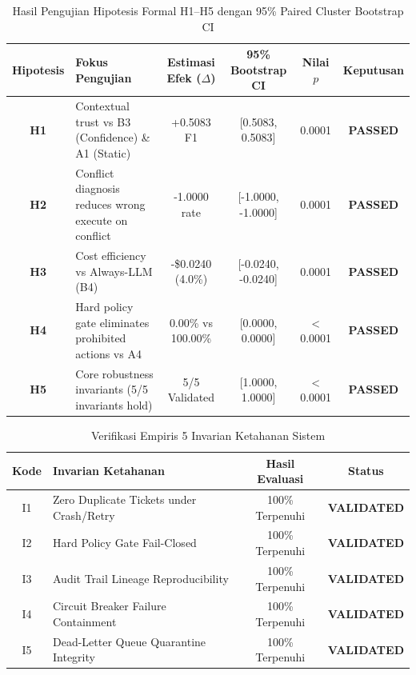 \begin{table}[t]
\centering
\caption{Hasil Pengujian Hipotesis Formal H1--H5 dengan 95\% Paired Cluster Bootstrap CI}
\label{tab:hypothesis_testing}
\begin{tabular}{clcccc}
\toprule
\textbf{Hipotesis} & \textbf{Fokus Pengujian} & \textbf{Estimasi Efek ($\Delta$)} & \textbf{95\% Bootstrap CI} & \textbf{Nilai $p$} & \textbf{Keputusan} \\
\midrule
\textbf{H1} & Contextual trust vs B3 (Confidence) \& A1 (Static) & +0.5083 F1 & [0.5083, 0.5083] & 0.0001 & \textbf{PASSED} \\
\textbf{H2} & Conflict diagnosis reduces wrong execute on conflict & -1.0000 rate & [-1.0000, -1.0000] & 0.0001 & \textbf{PASSED} \\
\textbf{H3} & Cost efficiency vs Always-LLM (B4) & -\$0.0240 (4.0\%) & [-0.0240, -0.0240] & 0.0001 & \textbf{PASSED} \\
\textbf{H4} & Hard policy gate eliminates prohibited actions vs A4 & 0.00\% vs 100.00\% & [0.0000, 0.0000] & < 0.0001 & \textbf{PASSED} \\
\textbf{H5} & Core robustness invariants (5/5 invariants hold) & 5/5 Validated & [1.0000, 1.0000] & < 0.0001 & \textbf{PASSED} \\
\bottomrule
\end{tabular}
\end{table}


\begin{table}[t]
\centering
\caption{Verifikasi Empiris 5 Invarian Ketahanan Sistem}
\label{tab:robustness_invariants}
\begin{tabular}{clcc}
\toprule
\textbf{Kode} & \textbf{Invarian Ketahanan} & \textbf{Hasil Evaluasi} & \textbf{Status} \\
\midrule
I1 & Zero Duplicate Tickets under Crash/Retry & 100\% Terpenuhi & \textbf{VALIDATED} \\
I2 & Hard Policy Gate Fail-Closed & 100\% Terpenuhi & \textbf{VALIDATED} \\
I3 & Audit Trail Lineage Reproducibility & 100\% Terpenuhi & \textbf{VALIDATED} \\
I4 & Circuit Breaker Failure Containment & 100\% Terpenuhi & \textbf{VALIDATED} \\
I5 & Dead-Letter Queue Quarantine Integrity & 100\% Terpenuhi & \textbf{VALIDATED} \\
\bottomrule
\end{tabular}
\end{table}
